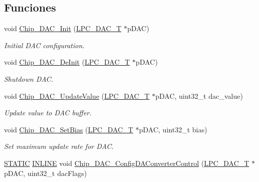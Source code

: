 \subsection*{Funciones}
\begin{DoxyCompactItemize}
\item 
void \hyperlink{group___d_a_c__18_x_x__43_x_x_ga677c6f03e4ea92656c4cb3497fbb4a1b}{Chip\+\_\+\+D\+A\+C\+\_\+\+Init} (\hyperlink{struct_l_p_c___d_a_c___t}{L\+P\+C\+\_\+\+D\+A\+C\+\_\+T} $\ast$p\+D\+AC)
\begin{DoxyCompactList}\small\item\em Initial D\+AC configuration. \end{DoxyCompactList}\item 
void \hyperlink{group___d_a_c__18_x_x__43_x_x_gabc7ee03f31b9085f6e77137e7ed1158d}{Chip\+\_\+\+D\+A\+C\+\_\+\+De\+Init} (\hyperlink{struct_l_p_c___d_a_c___t}{L\+P\+C\+\_\+\+D\+A\+C\+\_\+T} $\ast$p\+D\+AC)
\begin{DoxyCompactList}\small\item\em Shutdown D\+AC. \end{DoxyCompactList}\item 
void \hyperlink{group___d_a_c__18_x_x__43_x_x_ga8fa415039ac2f63388ff12cf43cc45bf}{Chip\+\_\+\+D\+A\+C\+\_\+\+Update\+Value} (\hyperlink{struct_l_p_c___d_a_c___t}{L\+P\+C\+\_\+\+D\+A\+C\+\_\+T} $\ast$p\+D\+AC, uint32\+\_\+t dac\+\_\+value)
\begin{DoxyCompactList}\small\item\em Update value to D\+AC buffer. \end{DoxyCompactList}\item 
void \hyperlink{group___d_a_c__18_x_x__43_x_x_ga01352564a69b1286d45a65cf06a246f2}{Chip\+\_\+\+D\+A\+C\+\_\+\+Set\+Bias} (\hyperlink{struct_l_p_c___d_a_c___t}{L\+P\+C\+\_\+\+D\+A\+C\+\_\+T} $\ast$p\+D\+AC, uint32\+\_\+t bias)
\begin{DoxyCompactList}\small\item\em Set maximum update rate for D\+AC. \end{DoxyCompactList}\item 
\hyperlink{group___l_p_c___types___public___macros_ga10b2d890d871e1489bb02b7e70d9bdfb}{S\+T\+A\+T\+IC} \hyperlink{spifi__18xx__43xx_8h_a2eb6f9e0395b47b8d5e3eeae4fe0c116}{I\+N\+L\+I\+NE} void \hyperlink{group___d_a_c__18_x_x__43_x_x_gadd2150c87e3fc28f301417f34a5eb287}{Chip\+\_\+\+D\+A\+C\+\_\+\+Config\+D\+A\+Converter\+Control} (\hyperlink{struct_l_p_c___d_a_c___t}{L\+P\+C\+\_\+\+D\+A\+C\+\_\+T} $\ast$p\+D\+AC, uint32\+\_\+t dac\+Flags)

\end{DoxyCompactItemize}
